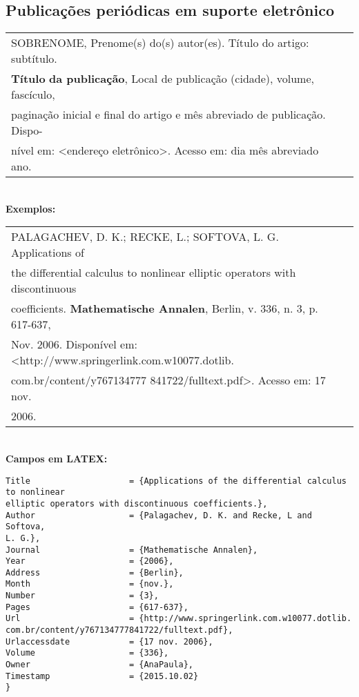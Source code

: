 \subsection{Publicações periódicas em suporte eletrônico}

\begin{tabular}{|l|c|} \hline
SOBRENOME, Prenome(s) do(s) autor(es). Título do artigo: subtítulo. \ \\\textbf{Título}  \textbf{da publicação}, Local de publicação (cidade), volume, fascículo, \\paginação inicial e final do artigo e mês abreviado de publicação. Dispo-\\nível em: <endereço eletrônico>. Acesso em: dia mês abreviado ano. \\\hline
\end{tabular} \\

\textbf{Exemplos:} \\

\begin{tabular}{|l|c|} \hline
PALAGACHEV, D. K.; RECKE, L.; SOFTOVA, L. G. Applications of\\ the
differential calculus to nonlinear elliptic operators with discontinuous\\
coefficients.  \textbf{Mathematische Annalen}, Berlin, v. 336, n. 3, p. 617-637,
\\Nov. 2006. Disponível em:
<http://www.springerlink.com.w10077.dotlib.\\com.br/content/y767134777
841722/fulltext.pdf>. Acesso em: 17 nov. \\2006. 
	\\\hline
\end{tabular} \\

\textbf{Campos em LATEX:} 

\begin{verbatim}
Title                    = {Applications of the differential calculus 
to nonlinear
elliptic operators with discontinuous coefficients.},
Author                   = {Palagachev, D. K. and Recke, L and 
Softova, 
L. G.},
Journal                  = {Mathematische Annalen},
Year                     = {2006},
Address                  = {Berlin},
Month                    = {nov.},
Number                   = {3},
Pages                    = {617-637},
Url                      = {http://www.springerlink.com.w10077.dotlib.
com.br/content/y767134777841722/fulltext.pdf},
Urlaccessdate            = {17 nov. 2006},
Volume                   = {336},
Owner                    = {AnaPaula},
Timestamp                = {2015.10.02}
}
\end{verbatim}

